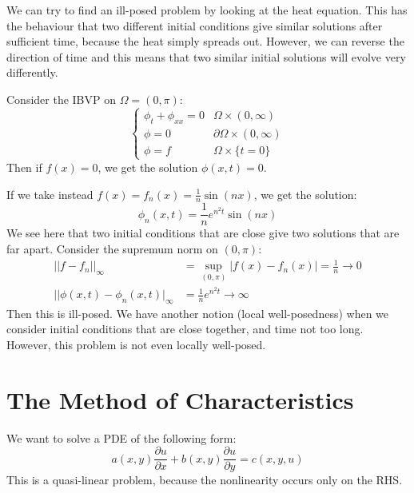 \documentclass[../Main.tex]{subfiles}
\begin{document}
\begin{example}
    We can try to find an ill-posed problem by looking at the heat equation. This has the behaviour that two different initial conditions give similar solutions after sufficient time, because the heat simply spreads out. However, we can reverse the direction of time and this means that two similar initial solutions will evolve very differently.

    Consider the IBVP on $\Omega = (0, \pi)$:
    \begin{equation*}
        \begin{cases}
            \phi_t + \phi_{xx} = 0 & \Omega \times (0, \infty) \\
            \phi = 0 & \partial \Omega \times (0, \infty) \\
            \phi = f & \Omega \times \{t = 0\}
        \end{cases}
    \end{equation*}
    Then if $f(x) = 0$, we get the solution $\phi(x, t) = 0$.

    If we take instead $f(x) = f_n(x) = \frac{1}{n} \sin(nx)$, we get the solution:
    \begin{equation*}
        \phi_n(x, t) = \frac{1}{n} e^{n^2 t} \sin(nx)
    \end{equation*}
    We see here that two initial conditions that are close give two solutions that are far apart. Consider the supremum norm on $(0, \pi)$:
    \begin{align*}
        ||f - f_n||_\infty &= \sup_{(0, \pi)} |f(x) - f_n(x)| = \frac1n \to 0 \\
        ||\phi(x, t) - \phi_n(x, t)|_\infty &= \frac{1}{n} e^{n^2 t} \to \infty
    \end{align*}
    Then this is ill-posed. We have another notion (local well-posedness) when we consider initial conditions that are close together, and time not too long. However, this problem is not even locally well-posed.
\end{example}
\section{The Method of Characteristics}
We want to solve a PDE of the following form:
\begin{equation*}
    a(x, y) \frac{\partial u}{\partial x} + b(x, y) \frac{\partial u}{\partial y} = c(x, y, u)
\end{equation*}
This is a quasi-linear problem, because the nonlinearity occurs only on the RHS.
\end{document}
